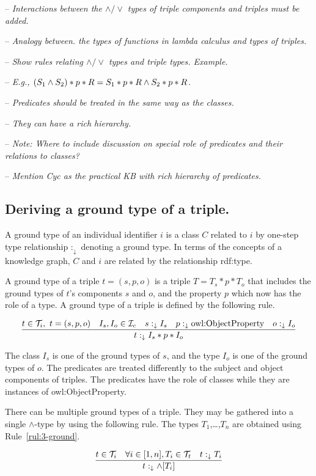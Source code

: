 \documentclass[runningheads]{llncs}
\newcommand{\darr}{\downarrow}
\newcommand{\Ic}{{\cal I}_c}
\newcommand{\Ti}{{\cal T}_i}
\newcommand{\Tt}{{\cal T}_t}
\newcommand{\notes}[1]{\noindent\begin{small}-- \emph{#1}\\\end{small}}
\begin{document}
\notes{Interactions between the $\land/\lor$ types of triple components and triples must be added.}
\notes{Analogy between. the types of functions in lambda calculus and types of triples.}
\notes{Show rules relating $\land/\lor$ types and triple types. Example.}
\notes{E.g., $(S_1\land\/S_2)*p*R = S_1*p*R\land\/S_2*p*R$.}

\notes{Predicates should be treated in the same way as the classes.}
\notes{They can have a rich hierarchy.}
\notes{\emph{Note:} Where to include discussion on special role of predicates and their relations to classes?}
\notes{Mention Cyc as the practical KB with rich hierarchy of predicates.}




\subsection{Deriving a ground type of a triple.}

\noindent
A ground type of an individual identifier $i$ is a class $C$ related
to $i$ by one-step type relationship $:_\darr$ denoting a ground
type. In terms of the concepts of a knowledge graph, $C$ and $i$ are
related by the relationship rdf:type.

A ground type of a triple $t=(s,p,o)$ is a triple $T=T_s*p*T_o$ that
includes the ground types of $t$'s components $s$ and $o$, and the
property $p$ which now has the role of a type. A ground type of a
triple is defined by the following rule.

\begin{equation}
  \label{rul:3-ground}
\dfrac{t\in\/\Ti,\ t=(s,p,o)\quad I_s,I_o\in\Ic\quad s:_\darr\/I_s\quad p:_\darr\text{owl:ObjectProperty}\quad o:_\darr\/I_o}
      {t:_\darr\/I_s*p*I_o}
\end{equation}

The class $I_s$ is one of the ground types of $s$, and the type $I_o$
is one of the ground types of $o$. The predicates are treated
differently to the subject and object components of triples. The
predicates have the role of classes while they are instances of
owl:ObjectProperty.

There can be multiple ground types of a triple. They may be gathered
into a single $\land$-type by using the following rule. The types
$T_1$,\ldots,$T_n$ are obtained using Rule~\ref{rul:3-ground}.

\begin{equation}
\label{rul:3-ground-gather}
\dfrac{t\in \Ti\quad \forall i\in[1,n], T_i\in\Tt\quad t:_\darr\/T_i}
      {t:_\darr\land[T_i]}
\end{equation}
\end{document}
